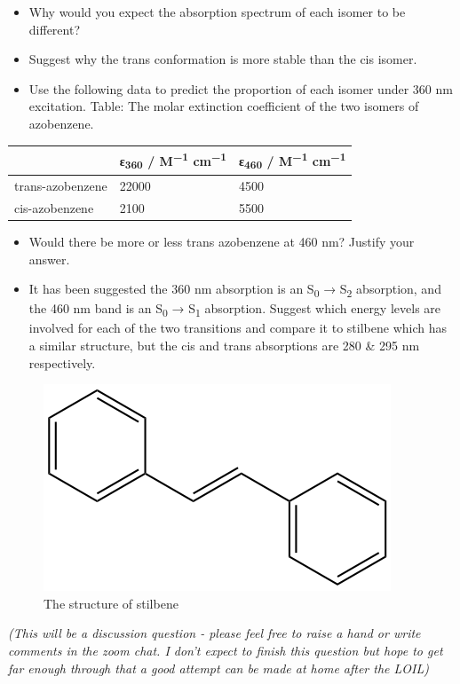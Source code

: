 \documentclass[
]{book}
\begin{document}
\begin{itemize}
\item
  Why would you expect the absorption spectrum of each isomer to be different?
\item
  Suggest why the trans conformation is more stable than the cis isomer.
\item
  Use the following data to predict the proportion of each isomer under 360 nm excitation.
  Table: \label{tab:azobenzneabs} The molar extinction coefficient of the two isomers of azobenzene.
\end{itemize}

\begin{longtable}[]{@{}lll@{}}
\toprule
& ε\textsubscript{360} / M\textsuperscript{−1} cm\textsuperscript{−1} & ε\textsubscript{460} / M\textsuperscript{−1} cm\textsuperscript{−1}\tabularnewline
\midrule
\endhead
trans-azobenzene & 22000 & 4500\tabularnewline
cis-azobenzene & 2100 & 5500\tabularnewline
\bottomrule
\end{longtable}

\begin{itemize}
\item
  Would there be more or less trans azobenzene at 460 nm? Justify your answer.
\item
  It has been suggested the 360 nm absorption is an S\textsubscript{0} → S\textsubscript{2} absorption, and the 460 nm band is an S\textsubscript{0} → S\textsubscript{1} absorption. Suggest which energy levels are involved for each of the two transitions and compare it to stilbene which has a similar structure, but the cis and trans absorptions are 280 \& 295 nm respectively.
\end{itemize}

\begin{figure}

{\centering \includegraphics[width=0.7\linewidth]{images/stilbene} 

}

\caption{The  structure of stilbene}\label{fig:stilbene}
\end{figure}

\emph{(This will be a discussion question - please feel free to raise a hand or write comments in the zoom chat. I don't expect to finish this question but hope to get far enough through that a good attempt can be made at home after the LOIL)}

  
\end{document}
